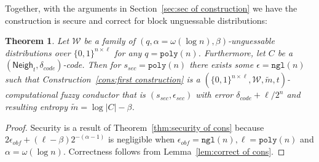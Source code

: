 \documentclass[11pt]{article}
\newcommand{\secref}[1]{\mbox{Section~\ref{#1}}}
\newcommand{\thref}[1]{\mbox{Theorem~\ref{#1}}}
\newcommand{\lemref}[1]{\mbox{Lemma~\ref{#1}}}
\newcommand{\consref}[1]{\mbox{Construction~\ref{#1}}}
\DeclareMathOperator*{\expe}{\mathbb{E}}
\newcommand{\class}[1]{{\ensuremath{\mathsf{#1}}}}
\newcommand{\zo}{\ensuremath{\{0, 1\}}}
\newcommand{\neigh}{\ensuremath{\class{Neigh}}\xspace}
\newcommand{\dis}{\ensuremath{\mathsf{dis}}}
\newcommand{\poly}{\ensuremath{\mathtt{poly}}\xspace}
\newcommand{\ngl}{\ensuremath{\mathtt{ngl}}\xspace}
\newtheorem{theorem}{Theorem}[section]
\newtheorem{lemma}[theorem]{Lemma}
\newcommand{\authnote}[2]{{\textcolor{red}{\textsf{#1 notes: }\textcolor{blue}{ #2}}\marginpar{\textcolor{red}{\textbf{!!!!!}}}}}
\newcommand{\authnote}[2]{}
\newcommand{\bnote}[1]{{\authnote{Ben}{#1}}}
\begin{document}

Together, with the arguments in \secref{sec:sec of construction} we have the construction is secure and correct for block unguessable distributions:
\begin{theorem}
Let $\mathcal{W}$ be a family of $(q,\alpha= \omega(\log n),  \beta)$-unguessable distributions over $\zo^{n\times \ell}$ for any $q = \poly(n)$.  Furthermore, let $C$ be a $(\neigh_t, \delta_{code})$-code.  Then for $s_{sec} = \poly(n)$ there exists some $\epsilon=\ngl(n)$ such that \consref{cons:first construction} is a $(\zo^{n\times \ell}, \mathcal{W}, \tilde{m}, t)$-computational fuzzy conductor that is $(s_{sec}, \epsilon_{sec})$ with error $\delta_{code} + \ell/2^n$ and resulting entropy $\tilde{m} =\log |C| - \beta$.
\end{theorem}
\begin{proof}
Security is a result of \thref{thm:security of cons} because $2\epsilon_{obf} + (\ell-\beta)2^{-(\alpha-1)}$ is negligible when $\epsilon_{obf} = \ngl(n), \ell = \poly(n)$ and $\alpha =\omega(\log n)$.  Correctness follows from \lemref{lem:correct of cons}.
\end{proof}
\end{document}
